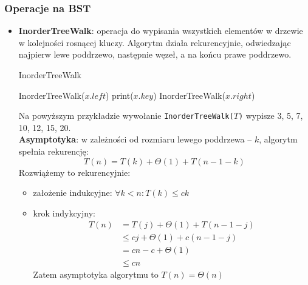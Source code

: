 \documentclass[11pt,a4paper]{article}
\begin{document}
\subsubsection{Operacje na BST}
\begin{itemize}
    \item \textbf{InorderTreeWalk}: operacja do wypisania wszystkich elementów w drzewie w kolejności rosnącej kluczy. Algorytm działa rekurencyjnie, odwiedzając najpierw lewe poddrzewo, następnie węzeł, a na końcu prawe poddrzewo. \\
        \begin{algorithm}
            \caption{InorderTreeWalk}
            \begin{algorithmic}[1]
                    \State InorderTreeWalk($x.left$)
                    \State print($x.key$)
                    \State InorderTreeWalk($x.right$)
                \EndIf
                \EndProcedure
            \end{algorithmic}
        \end{algorithm}
        Na powyższym przykładzie wywołanie \texttt{InorderTreeWalk($T$)} wypisze 3, 5, 7, 10, 12, 15, 20. \\
        \textbf{Asymptotyka}: w zależności od rozmiaru lewego poddrzewa -- $k$, algorytm spełnia rekurencję:
        \[
            T(n) = T(k) + \Theta(1) + T(n-1-k)
        \]
        Rozwiążemy to rekurencyjnie:
        \begin{itemize}
            \item założenie indukcyjne: $\forall k < n: T(k) \leq ck$
            \item krok indykcyjny:
                \begin{equation*}\begin{aligned}
                    T(n) &= T(j) + \Theta(1) + T(n-1-j)\\
                         &\leq cj + \Theta(1) +c(n-1-j) \\
                         &= cn -c +\Theta(1) \\
                         &\leq cn
                \end{aligned}\end{equation*}
                Zatem asymptotyka algorytmu to $T(n) = \Theta(n)$
        \end{itemize}


\end{itemize}
\end{document}
